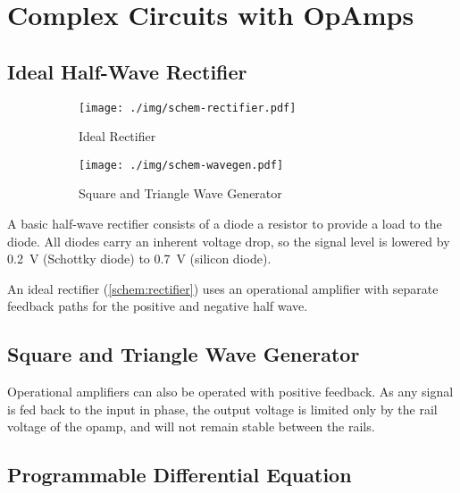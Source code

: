 \chapter{Complex Circuits with OpAmps}
\section{Ideal Half-Wave Rectifier}

\begin{figure}
	\centering
	\begin{subfigure}{0.4\textwidth}
		\centering
		\texttt{[image: ./img/schem-rectifier.pdf]}
		\caption{Ideal Rectifier}
		\label{schem:rectfier}
	\end{subfigure}
	\begin{subfigure}{0.4\textwidth}
		\centering
		\texttt{[image: ./img/schem-wavegen.pdf]}
		\caption{Square and Triangle Wave Generator}
		\label{schem:wavegen}
	\end{subfigure}
	\caption{}
\end{figure}

A basic half-wave rectifier consists of a diode a resistor to provide a load to the diode.
All diodes carry an inherent voltage drop, so the signal level is lowered by \SI{0.2}{\volt} (Schottky diode) to \SI{0.7}{\volt} (silicon diode).

An ideal rectifier (\autoref{schem:rectifier}) uses an operational amplifier with separate feedback paths for the positive and negative half wave.

\section{Square and Triangle Wave Generator}

Operational amplifiers can also be operated with positive feedback.
As any signal is fed back to the input in phase, the output voltage is limited only by the rail voltage of the opamp, and will not remain stable between the rails.

\section{Programmable Differential Equation}
